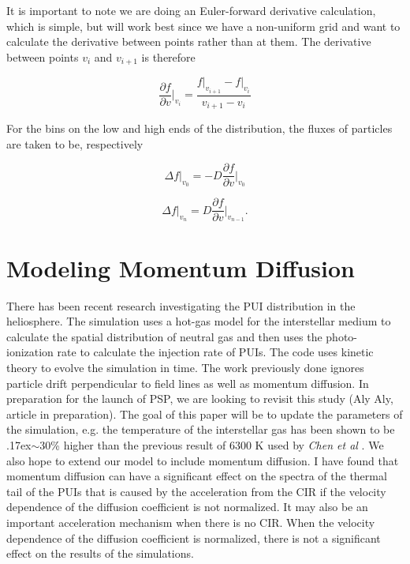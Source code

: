 \documentclass[%
 reprint,
 amsmath,amssymb,
 aps,
]{revtex4-1}
\begin{document}
It is important to note we are doing an Euler-forward derivative calculation, which is simple, but will work best since we have a non-uniform grid and want to calculate the derivative between points rather than at them. The derivative between points $v_i$ and $v_{i+1}$ is therefore

\begin{equation}
	\label{euler}
    \frac{\partial f}{\partial v}\biggr\rvert_{v_i} = \frac{f\big\rvert_{v_{i+1}} - f \big\rvert_{v_{i}} }{ v_{i+1} - v_i } 
\end{equation}

For the bins on the low and high ends of the distribution, the fluxes of particles are taken to be, respectively

\begin{equation}
    \Delta f \biggr\rvert_{v_0}  =   - D  \frac{\partial f}{\partial v}\biggr\rvert_{v_{0}}
\end{equation}

\begin{equation}
    \Delta f \biggr\rvert_{v_n}  =   D  \frac{\partial f}{\partial v}\biggr\rvert_{v_{n-1}} .
\end{equation}


\section{Modeling Momentum Diffusion}

There has been recent research \cite{chen} investigating the PUI distribution in the heliosphere. The simulation uses a hot-gas model for the interstellar medium to calculate the spatial distribution of neutral gas and then uses the photo-ionization rate to calculate the injection rate of PUIs. The code uses kinetic theory to evolve the simulation in time. The work previously done ignores particle drift perpendicular to field lines as well as momentum diffusion. In preparation for the launch of PSP, we are looking to revisit this study (Aly Aly, article in preparation). The goal of this paper will be to update the parameters of the simulation, e.g. the temperature of the interstellar gas has been shown to be \raise.17ex\hbox{$\scriptstyle\sim$}30\% higher \cite{ismtemp} than the previous result of 6300 K \cite{ismold} used by \textit{Chen et al} \cite{chen}. We also hope to extend our model to include momentum diffusion. I have found that momentum diffusion can have a significant effect on the spectra of the thermal tail of the PUIs that is caused by the acceleration from the CIR if the velocity dependence of the diffusion coefficient is not normalized. It may also be an important acceleration mechanism when there is no CIR. When the velocity dependence of the diffusion coefficient is normalized, there is not a significant effect on the results of the simulations.
\end{document}
